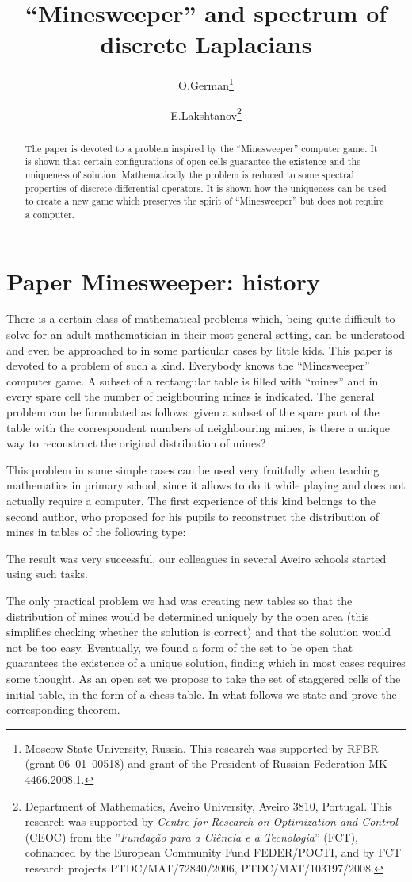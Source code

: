 \documentclass[english,12pt]{article}
\author{O.German\thanks{Moscow State University, Russia. This research was  supported by
                        RFBR (grant  06--01--00518) and
                        grant of the President of Russian Federation
                         MK--4466.2008.1. }
\and E.Lakshtanov\thanks{Department of Mathematics, Aveiro
University, Aveiro 3810, Portugal. This research was supported by
{\it Centre for Research on Optimization and Control} (CEOC) from
the ''{\it Funda\c{c}\~{a}o para a Ci\^{e}ncia e a Tecnologia}''
(FCT), cofinanced by the European Community Fund FEDER/POCTI, and
by FCT research projects PTDC/MAT/72840/2006,
PTDC/MAT/103197/2008.}}
\title{``Minesweeper'' and spectrum of discrete Laplacians}
\date{}
\theoremstyle{remark}
\theoremstyle{definition}
\theoremstyle{definition}
\begin{document}
\maketitle

\begin{abstract}
The paper is devoted to a problem inspired by the ``Minesweeper''
computer game. It is shown that certain configurations of open
cells guarantee the existence and the uniqueness of solution.
Mathematically the problem is reduced to some spectral properties
of discrete differential operators. It is shown how the uniqueness
can be used to create a new game which preserves the spirit of
``Minesweeper'' but does not require a computer.
\end{abstract}



\section{Paper Minesweeper: history}


There is a certain class of mathematical problems which, being quite difficult to solve for an
adult mathematician in their most general setting, can be understood and even be approached to in
some particular cases by little kids. This paper is devoted to a problem of such a kind. Everybody
knows the ``Minesweeper'' computer game. A subset of a rectangular table is filled with ``mines''
and in every spare cell the number of neighbouring mines is indicated. The general problem can be
formulated as follows: given a subset of the spare part of the table with the correspondent numbers
of neighbouring mines, is there a unique way to reconstruct the original distribution of mines?

This problem in some simple cases can be used very fruitfully when teaching mathematics in primary
school, since it allows to do it while playing and does not actually require a computer. The first
experience of this kind belongs to the second author, who proposed for his pupils to reconstruct
the distribution of mines in tables of the following type:

The result was very successful, our colleagues in several Aveiro
schools started using such tasks.

The only practical problem we had was creating new tables so that the distribution of mines would
be determined uniquely by the open area (this simplifies checking whether the solution is correct)
and that the solution would not be too easy. Eventually, we found a form of the set to be open that
guarantees the existence of a unique solution, finding which in most cases requires some thought.
As an open set we propose to take the set of staggered cells of the initial table, in the form of a
chess table. In what follows we state and prove the corresponding theorem.
\end{document}
